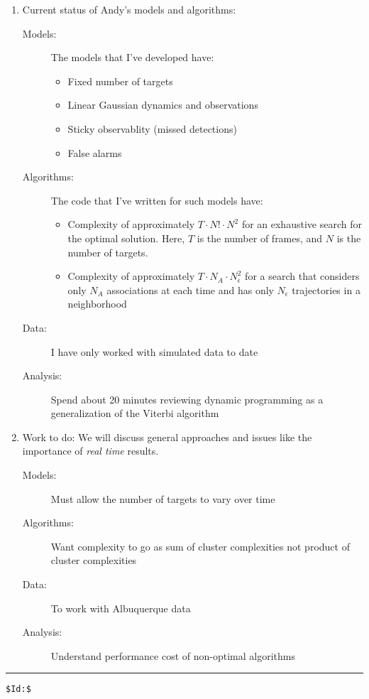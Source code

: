 \documentclass{article}
\begin{document}
\begin{enumerate}
\item Current status of Andy's models and algorithms:
  \begin{description}
  \item[Models:] The models that I've developed have:
    \begin{itemize}
    \item Fixed number of targets
    \item Linear Gaussian dynamics and observations
    \item Sticky observablity (missed detections)
    \item False alarms
    \end{itemize}
  \item[Algorithms:]  The code that I've written for such models have:
    \begin{itemize}
    \item Complexity of approximately $T\cdot N!\cdot N^2$ for an
      exhaustive search for the optimal solution.  Here, $T$ is the
      number of frames, and $N$ is the number of targets.
    \item Complexity of approximately $T\cdot N_A\cdot N_\epsilon^2$ for
      a search that considers only $N_A$ associations at each time
      and has only $N_\epsilon$ trajectories in a neighborhood
    \end{itemize}
  \item[Data:] I have only worked with simulated data to date
  \item[Analysis:] Spend about 20 minutes reviewing dynamic
    programming as a generalization of the Viterbi algorithm
  \end{description}
\item Work to do:
  We will discuss general approaches and issues like the importance of
  \emph{real time} results.
  \begin{description}
  \item[Models:] Must allow the number of targets to vary over time
  \item[Algorithms:] Want complexity to go as sum of cluster
    complexities not product of cluster complexities
  \item[Data:] To work with Albuquerque data
  \item[Analysis:] Understand performance cost of non-optimal
    algorithms
  \end{description}
\end{enumerate}

\vfill \hrule
\begin{verbatim}
$Id:$
\end{verbatim}
\end{document}
